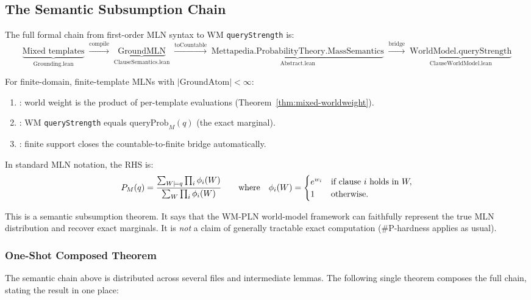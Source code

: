 \documentclass[11pt,openany]{report}
\begin{document}
\subsection{The Semantic Subsumption Chain}

The full formal chain from first-order MLN syntax to WM
\texttt{queryStrength} is:
\[
  \underbrace{\text{Mixed templates}}_{\text{Grounding.lean}}
  \;\xrightarrow{\mathrm{compile}}\;
  \underbrace{\text{GroundMLN}}_{\text{ClauseSemantics.lean}}
  \;\xrightarrow{\mathrm{toCountable}}\;
  \underbrace{\text{Mettapedia.ProbabilityTheory.MassSemantics}}_{\text{Abstract.lean}}
  \;\xrightarrow{\mathrm{bridge}}\;
  \underbrace{\text{WorldModel.queryStrength}}_{\text{ClauseWorldModel.lean}}
\]

For finite-domain, finite-template MLNs with $|\mathrm{GroundAtom}| < \infty$:
\begin{enumerate}
\item {}: world weight is the
  product of per-template evaluations (Theorem~\ref{thm:mixed-worldweight}).
\item {}: WM \texttt{queryStrength}
  equals $\mathrm{queryProb}_M(q)$ (the exact marginal).
\item {}: finite
  support closes the countable-to-finite bridge automatically.
\end{enumerate}

In standard MLN notation, the RHS is:
\[
  P_M(q) = \frac{%
    \sum_{W \models q} \prod_i \phi_i(W)}{%
    \sum_W \prod_i \phi_i(W)}
  \qquad\text{where}\quad
  \phi_i(W) = \begin{cases}
    e^{w_i} & \text{if clause $i$ holds in } W, \\
    1 & \text{otherwise.}
  \end{cases}
\]

This is a semantic subsumption theorem.  It says that the WM-PLN
world-model framework can faithfully represent the true MLN distribution
and recover exact marginals.  It is \emph{not} a claim of generally
tractable exact computation (\#P-hardness applies as usual).

\subsubsection{One-Shot Composed Theorem}

The semantic chain above is distributed across several files and
intermediate lemmas.  The following single theorem composes the full
chain, stating the result in one place:
\end{document}
